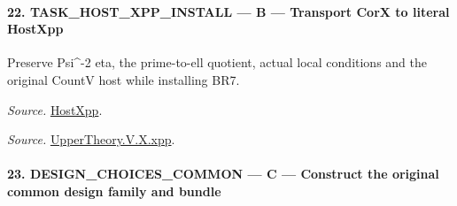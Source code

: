 \paragraph{22. TASK\_\allowbreak HOST\_\allowbreak XPP\_\allowbreak INSTALL — B — Transport CorX to literal HostXpp}

Preserve Psi\textasciicircum{}-2 eta, the prime-to-ell quotient, actual local conditions and the original CountV host while installing BR7.

\emph{Source.} \href{https://github.com/CocoSgt/riemann-hypothesis-lean/blob/7cbf7a0c32fca1badf05931879a37c3f8a2b03b4/src/Development/AutomorphicArithmetic/AutomorphicVarieties/UnitaryThreeDeformations/HostNumber.lean#L14-L17}{HostXpp}.

\emph{Source.} \href{https://github.com/CocoSgt/riemann-hypothesis-lean/blob/7cbf7a0c32fca1badf05931879a37c3f8a2b03b4/src/Development/AutomorphicArithmetic/AutomorphicVarieties/LevelCohomology/Xpp.lean#L11-L84}{UpperTheory.V.X.xpp}.



\paragraph{23. DESIGN\_\allowbreak CHOICES\_\allowbreak COMMON — C — Construct the original common design family and bundle}

